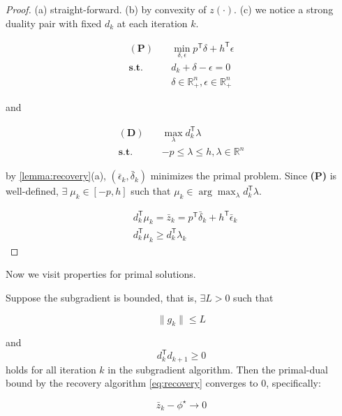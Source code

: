 \documentclass[../main]{subfiles}
\begin{document}
\begin{proof}
  (a) straight-forward. (b) by convexity of \(z(\cdot)\). (c)
  we notice a strong duality pair with fixed \(d_k\) at each iteration
  \(k\).

  \begin{equation}
    \begin{aligned}
      \mathbf{(P)}  \quad & \min_{\delta, \epsilon} p^\mathsf{T} \delta + h^\mathsf{T} \epsilon \\
      \mathbf{s.t.} \quad & d_k + \delta - \epsilon = 0                                         \\
                          & \delta \in \mathbb{R}_+^n, \epsilon \in \mathbb{R}_+^n
    \end{aligned}
  \end{equation}

  and

  \begin{equation}
    \begin{aligned}
      \mathbf{(D)}  \quad & \max_{\lambda} d_k^\mathsf{T} \lambda          \\
      \mathbf{s.t.} \quad & -p \le \lambda \le h, \lambda \in \mathbb{R}^n
    \end{aligned}
  \end{equation}

  by \ref{lemma:recovery}(a), \((\bar \epsilon_k, \bar \delta_k)\) minimizes the primal
  problem. Since \textbf{(P)} is well-defined,
  \(\exists\; \mu_k \in [-p, h]\) such that \(\mu_k \in \arg\max_{\lambda} d_k^\mathsf{T} \lambda \).

  \[\begin{aligned}
       & d_k^\mathsf{T} \mu_k = \bar z_k = p^\mathsf{T} \bar \delta_k + h^\mathsf{T} \bar \epsilon_k \\
       & d_k^\mathsf{T} \mu_k \ge  d_k^\mathsf{T} \lambda_k
    \end{aligned}\]


\end{proof}

Now we visit properties for primal solutions.

\begin{theorem} \label{theorem:primal}

  Suppose the subgradient is bounded, that is, \(\exists L > 0\) such that

  \begin{equation}\label{eq:bounded_subgrad}
    \|g_k\| \le L
  \end{equation}

  and
  \begin{equation}\label{eq:non_orthogonal_direction}
    d_k^\mathsf{T} d_{k+1} \ge 0
  \end{equation}
  holds for all iteration \(k\) in the subgradient algorithm.
  Then the primal-dual bound by the recovery algorithm \eqref{eq:recovery} converges to \(0\), specifically:

  \[\bar z_k - \phi^\star \to 0\]

\end{theorem}
\end{document}
